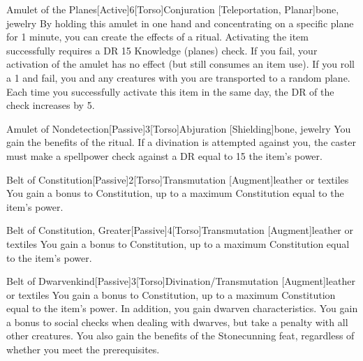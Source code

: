             \begin{magicitemdef}{Amulet of the Planes}[Active]{6}[Torso]{Conjuration [Teleportation, Planar]}{bone, jewelry}
                By holding this amulet in one hand and concentrating on a specific plane for 1 minute, you can create the effects of a  ritual.
                Activating the item successfully requires a DR 15 Knowledge (planes) check.
                If you fail, your activation of the amulet has no effect (but still consumes an item use).
                If you roll a 1 and fail, you and any creatures with you are transported to a random plane.
                Each time you successfully activate this item in the same day, the DR of the check increases by 5.
            \end{magicitemdef}

            \begin{magicitemdef}{Amulet of Nondetection}[Passive]{3}[Torso]{Abjuration [Shielding]}{bone, jewelry}
                 You gain the benefits of the  ritual.
                If a divination is attempted against you, the caster must make a spellpower check against a DR equal to 15 \add the item's power.
            \end{magicitemdef}

            \begin{magicitemdef}{Belt of Constitution}[Passive]{2}[Torso]{Transmutation [Augment]}{leather or textiles}
                 You gain a  bonus to Constitution, up to a maximum Constitution equal to the item's power.
            \end{magicitemdef}

            \begin{magicitemdef}{Belt of Constitution, Greater}[Passive]{4}[Torso]{Transmutation [Augment]}{leather or textiles}
                 You gain a  bonus to Constitution, up to a maximum Constitution equal to the item's power.
            \end{magicitemdef}

            \begin{magicitemdef}{Belt of Dwarvenkind}[Passive]{3}[Torso]{Divination/Transmutation [Augment]}{leather or textiles}
                 You gain a  bonus to Constitution, up to a maximum Constitution equal to the item's power.
                In addition, you gain dwarven characteristics.
                You gain a  bonus to social checks when dealing with dwarves, but take a  penalty with all other creatures.
                You also gain the benefits of the Stonecunning feat, regardless of whether you meet the prerequisites.
            \end{magicitemdef}

